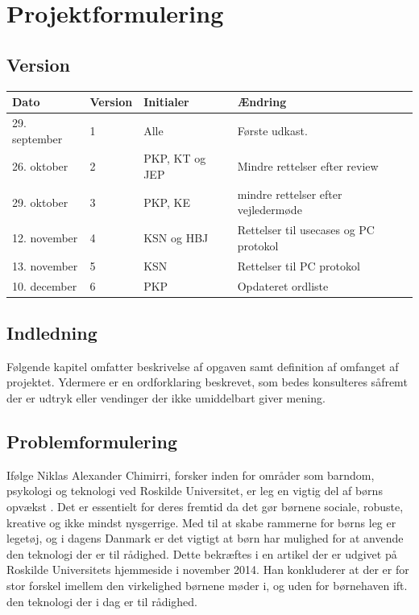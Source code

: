 \chapter{Projektformulering} \label{ch:projektformulering}
\section*{Version}
\begin{table}[h]
	\centering
	\begin{tabularx}{\textwidth - 2cm}{|l|l|l|X|}
	\hline
	Dato			& Version			& Initialer 		& Ændring										\\ \hline
	29. september 	& 1 				& Alle				& Første udkast. 								\\ \hline
	26. oktober		& 2 				& PKP, KT og JEP	& Mindre rettelser efter review					\\ \hline
	29.	oktober		& 3 				& PKP, KE 			& mindre rettelser efter vejledermøde			\\ \hline
	12.	november    & 4 				& KSN og HBJ		& Rettelser til usecases og PC protokol			\\ \hline
	13.	november    & 5 				& KSN       		& Rettelser til PC protokol						\\ \hline
	10.	december    & 6 				& PKP       		& Opdateret ordliste							\\ \hline
	\end{tabularx}
\end{table}

\section*{Indledning}
Følgende kapitel omfatter beskrivelse af opgaven samt definition af omfanget af projektet.
Ydermere er en ordforklaring beskrevet, som bedes konsulteres såfremt der er udtryk eller vendinger der ikke umiddelbart giver mening.

\clearpage

\section{Problemformulering} \label{sec:problemformulering}
Ifølge Niklas Alexander Chimirri, forsker inden for områder som barndom, psykologi og teknologi ved Roskilde Universitet, er leg en vigtig del af børns opvækst \cite{lib:RUC}.   
Det er essentielt for deres fremtid da det gør børnene sociale, robuste, kreative og ikke mindst nysgerrige. Med til at skabe rammerne for børns leg er legetøj, og i dagens Danmark er det vigtigt at børn har mulighed for at anvende den teknologi der er til rådighed. 
Dette bekræftes i en artikel der er udgivet på Roskilde Universitets hjemmeside i november 2014.
Han konkluderer at der er for stor forskel imellem den virkelighed børnene møder i, og uden for børnehaven ift. den teknologi der i dag er til rådighed. 


